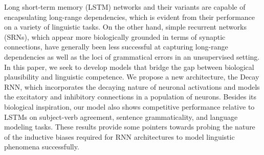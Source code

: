 Long short-term memory (LSTM) networks and their variants are capable of encapsulating long-range dependencies, which is evident from their performance on a variety of linguistic tasks. On the other hand, simple recurrent networks (SRNs), which appear more biologically grounded in terms of synaptic connections, have generally been less successful at capturing long-range dependencies as well as the loci of grammatical errors in an unsupervised setting. In this paper, we seek to develop models that bridge the gap between biological plausibility and linguistic competence. We propose a new architecture, the Decay RNN, which incorporates the decaying nature of neuronal activations and models the excitatory and inhibitory connections in a population of neurons. Besides its biological inspiration, our model also shows competitive performance relative to LSTMs on subject-verb agreement, sentence grammaticality, and language modeling tasks. These results provide some pointers towards probing the nature of the inductive biases required for RNN architectures to model linguistic phenomena successfully.
